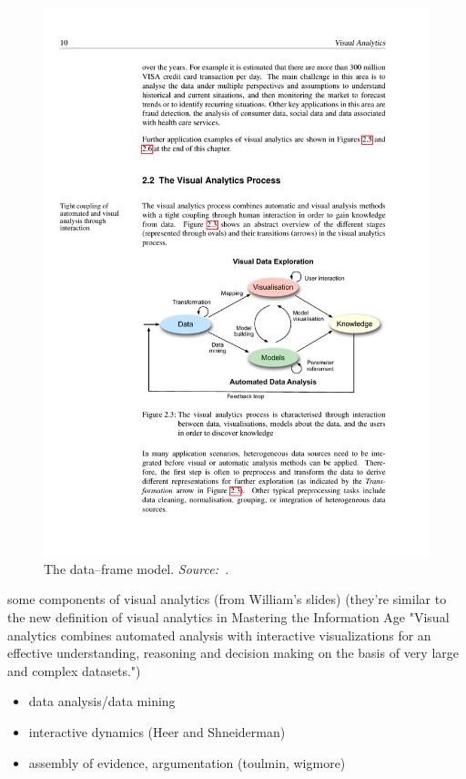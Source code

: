\begin{figure}[!htb]
	\centering
	\includegraphics[width=\columnwidth]{visual-analytics-process}
	\caption{The data--frame model. \emph{Source:~\cite{Klein2003}}.}
	\label{fig:visual-analytics-process}
\end{figure}

some components of visual analytics (from William's slides) (they're similar to the new definition of visual analytics in Mastering the Information Age
"Visual analytics combines automated analysis with interactive visualizations for an effective understanding, reasoning and decision making on the basis of very large and complex
datasets.")
\begin{itemize}
	\item data analysis/data mining
	\item interactive dynamics (Heer and Shneiderman) 
	\item assembly of evidence, argumentation (toulmin, wigmore)
\end{itemize}

